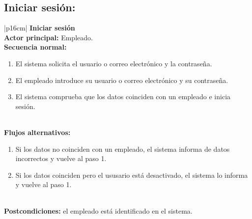     \subsection{Iniciar sesión:}
    \label{subsec:2.4.5.}
        \begin{longtable}{|p{16cm}|} 
        \hline
        \textbf{Iniciar sesión} \\ \hline
        \textbf{Actor principal:} Empleado. \\ \hline
        \textbf{Secuencia normal:} \\
        \begin{minipage}[t]{\linewidth}
            \begin{enumerate}
                \item El sistema solicita el usuario o correo electrónico y la contraseña.
                \item El empleado introduce su usuario o correo electrónico y su contraseña.
                \item El sistema comprueba que los datos coinciden con un empleado e inicia sesión.
            \end{enumerate}
            \vspace{1mm}
        \end{minipage} \\ \hline
        \textbf{Flujos alternativos:} \\
        \begin{minipage}[t]{\linewidth}
            \begin{enumerate}
                \item[3.a.] Si los datos no coinciden con un empleado, el sistema informa de datos incorrectos y vuelve al paso 1.
                \item[3.b.] Si los datos coinciden pero el ususario está desactivado, el sistema lo informa y vuelve al paso 1.
            \end{enumerate}
            \vspace{1mm}
        \end{minipage} \\ \hline
        \textbf{Postcondiciones:} el empleado está identificado en el sistema. \\ \hline
        \caption{Descripción general del caso de uso - Iniciar sesión.}
        \end{longtable}

